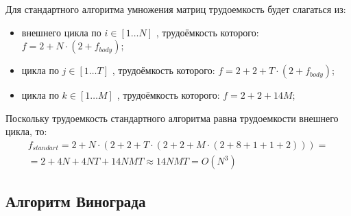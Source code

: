 Для стандартного алгоритма умножения матриц трудоемкость будет слагаться из:

\begin{itemize}[label=---]
	\item внешнего цикла по $i \in [1 \ldots N]$ , трудоёмкость которого: $f = 2 + N \cdot (2 + f_{body})$;
	\item цикла по $j \in [1 \ldots T]$ , трудоёмкость которого: $f = 2 + 2 + T \cdot (2 + f_{body})$;
	\item цикла по $k \in [1 \ldots M]$ , трудоёмкость которого: $f = 2 + 2 + 14M$;
\end{itemize}

Поскольку трудоемкость стандартного алгоритма равна трудоемкости внешнего цикла, то:
\begin{equation}
	\label{сomplexity:standart}
	\begin{gathered}
		f_{standart} = 2 + N \cdot (2 + 2 + T \cdot (2 + 2 + M \cdot (2 + 8 + 1 + 1 + 2)))= \\
		= 2 + 4N + 4NT + 14NMT \approx 14NMT = O(N^3)
	\end{gathered}
\end{equation}

\clearpage

\subsection{Алгоритм Винограда}

